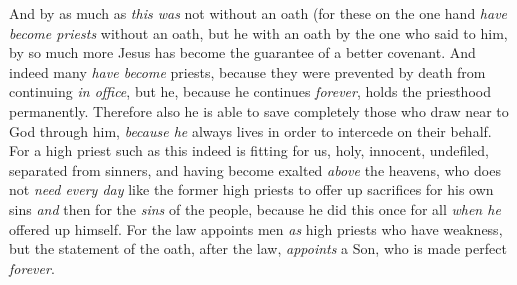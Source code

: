 \begin{biblechapter}
\verse And by as much as \textit{this was} not without an oath (for these on the one hand \textit{have become priests} without an oath,
\verse but he with an oath by the one who said to him,
\verse by so much more Jesus has become the guarantee of a better covenant.
\verse And indeed many \textit{have become} priests, because they were prevented by death from continuing \textit{in office},
\verse but he, because he continues \textit{forever}, holds the priesthood permanently.
\verse Therefore also he is able to save completely those who draw near to God through him, \textit{because he} always lives in order to intercede on their behalf.
\verse For a high priest such as this indeed is fitting for us, holy, innocent, undefiled, separated from sinners, and having become exalted \textit{above} the heavens,
\verse who does not \textit{need every day} like the former high priests to offer up sacrifices for his own sins \textit{and} then for the \textit{sins} of the people, because he did this once for all \textit{when he} offered up himself.
\verse For the law appoints men \textit{as} high priests who have weakness, but the statement of the oath, after the law, \textit{appoints} a Son, who is made perfect \textit{forever}.
\end{biblechapter}

